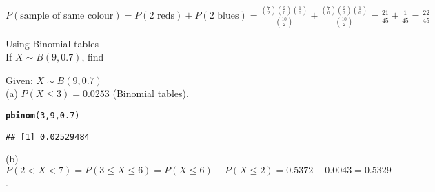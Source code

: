 \documentclass[bigtut]{tutorial}\usepackage[]{graphicx}\usepackage[]{color}
\makeatletter
\newcommand{\hlnum}[1]{\textcolor[rgb]{0.686,0.059,0.569}{#1}}%
\newcommand{\hlstd}[1]{\textcolor[rgb]{0.345,0.345,0.345}{#1}}%
\newcommand{\hlkwd}[1]{\textcolor[rgb]{0.737,0.353,0.396}{\textbf{#1}}}%
\newenvironment{kframe}{%
 \def\at@end@of@kframe{}%
 \ifinner\ifhmode%
  \def\at@end@of@kframe{\end{minipage}}%
  \begin{minipage}{\columnwidth}%
 \fi\fi%
 \def\FrameCommand##1{\hskip\@totalleftmargin \hskip-\fboxsep
 \colorbox{shadecolor}{##1}\hskip-\fboxsep
     \hskip-\linewidth \hskip-\@totalleftmargin \hskip\columnwidth}%
 \MakeFramed {\advance\hsize-\width
   \@totalleftmargin\z@ \linewidth\hsize
   \@setminipage}}%
 {\par\unskip\endMakeFramed%
 \at@end@of@kframe}
\newenvironment{knitrout}{}{} %
\makeatother
\begin{document}
\begin{tutorial}
\begin{questions}
\begin{solution}
$P(\text{sample of same colour}) 
= P(\text{2 reds}) +  P(\text{2 blues})  
= \frac{ {7 \choose 2}{2 \choose 0}{1 \choose 0} }{ {10 \choose 2}  } 
+ \frac{ {7 \choose 0}{2 \choose 2}{1 \choose 0} }{ {10 \choose 2}  } = \frac{21}{45} + \frac{1}{45} = \frac{22}{45} $ 
\end{solution}



\question Using Binomial tables \\

If $X \sim B(9,0.7)$, find 


\begin{solution}
Given: $X \sim B(9,0.7)$ \\

(a) 
$P(X \leq 3) = 0.0253$ (Binomial tables). \\

\begin{knitrout}
\color{fgcolor}\begin{kframe}
\begin{alltt}
\hlkwd{pbinom}\hlstd{(}\hlnum{3}\hlstd{,}\hlnum{9}\hlstd{,}\hlnum{0.7}\hlstd{)}
\end{alltt}
\begin{verbatim}
## [1] 0.02529484
\end{verbatim}
\end{kframe}
\end{knitrout}

\vspace{.5cm}
(b)
$P(2 < X < 7) = P(3 \leq X \leq 6) = P(X \leq 6) - P(X \leq 2) = 0.5372-0.0043 = 0.5329$. \\


\end{solution}
\end{questions}
\end{tutorial}
\end{document}
